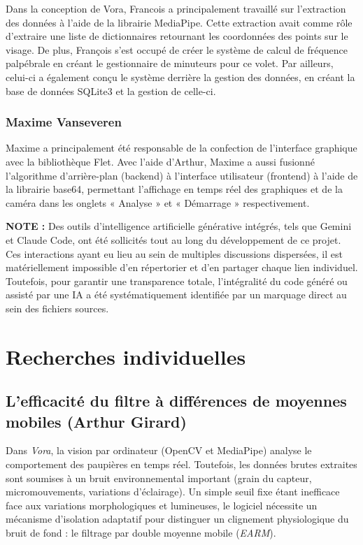 \documentclass{rapportbrebeuf}
\begin{document}
Dans la conception de Vora, Francois a principalement travaillé sur l’extraction des données à l’aide de la librairie MediaPipe. Cette extraction avait comme rôle d’extraire une liste de dictionnaires retournant les coordonnées des points sur le visage. De plus, François s'est occupé de créer le système de calcul de fréquence palpébrale en créant le gestionnaire de minuteurs pour ce volet. Par ailleurs, celui-ci a également conçu le système derrière la gestion des données, en créant la base de données SQLite3 et la gestion de celle-ci.  

\subsubsection{Maxime Vanseveren}

Maxime a principalement été responsable de la confection de l’interface graphique avec la bibliothèque Flet. Avec l’aide d’Arthur, Maxime a aussi fusionné l’algorithme d’arrière-plan (backend) à l’interface utilisateur (frontend) à l’aide de la librairie base64, permettant l’affichage en temps réel des graphiques et de la caméra dans les onglets « Analyse » et « Démarrage » respectivement. 

\vfill 

\begin{leftbar}
    \textbf{NOTE :} Des outils d'intelligence artificielle générative intégrés, tels que Gemini et Claude Code, ont été sollicités tout au long du développement de ce projet. Ces interactions ayant eu lieu au sein de multiples discussions dispersées, il est matériellement impossible d'en répertorier et d'en partager chaque lien individuel. Toutefois, pour garantir une transparence totale, l'intégralité du code généré ou assisté par une IA a été systématiquement identifiée par un marquage direct au sein des fichiers sources.
\end{leftbar}

\newpage
\section{Recherches individuelles}

\subsection{L'efficacité du filtre à différences de moyennes mobiles (Arthur Girard)}

Dans \textit{Vora}, la vision par ordinateur (OpenCV et MediaPipe) analyse le comportement des paupières en temps réel. Toutefois, les données brutes extraites sont soumises à un bruit environnemental important (grain du capteur, micromouvements, variations d'éclairage). Un simple seuil fixe étant inefficace face aux variations morphologiques et lumineuses, le logiciel nécessite un mécanisme d'isolation adaptatif pour distinguer un clignement physiologique du bruit de fond : le filtrage par double moyenne mobile (\textit{EARM}).
\end{document}
